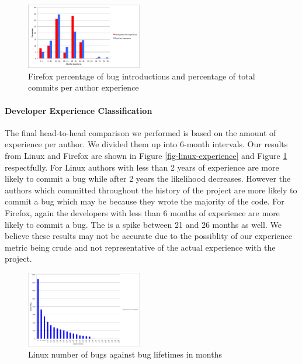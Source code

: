 \begin{figure}
\begin{center}
\includegraphics[width=0.45\textwidth]{firefox_day_per_experience.png}
\end{center}
\caption{Firefox percentage of bug introductions and percentage of total commits per author experience}
\label{fig-firefox-experience}
\end{figure}

\paragraph{Developer Experience Classification}
The final head-to-head comparison we performed is based on the amount
of experience per author. We divided them up into 6-month intervals. 
Our results from Linux and Firefox are shown in Figure
\ref{fig-linux-experience} and Figure \ref{fig-firefox-experience}
respectfully. For Linux authors with less than 2 years of experience
are more likely to commit a bug while after 2 years the likelihood
decreases. However the authors which committed throughout the history
of the project are more likely to commit a bug which may be because
they wrote the majority of the code. For Firefox, again the
developers with less than 6 months of experience are more likely to
commit a bug. The is a spike between 21 and 26 months as well. We
believe these results may not be accurate due to the possiblity of
our experience metric being crude and not representative of the 
actual experience with the project.

\begin{figure}
\begin{center}
\includegraphics[width=0.45\textwidth]{linux_bug_life.png}
\end{center}
\caption{Linux number of bugs against bug lifetimes in months}
\label{fig-linux-buglife}
\end{figure}


